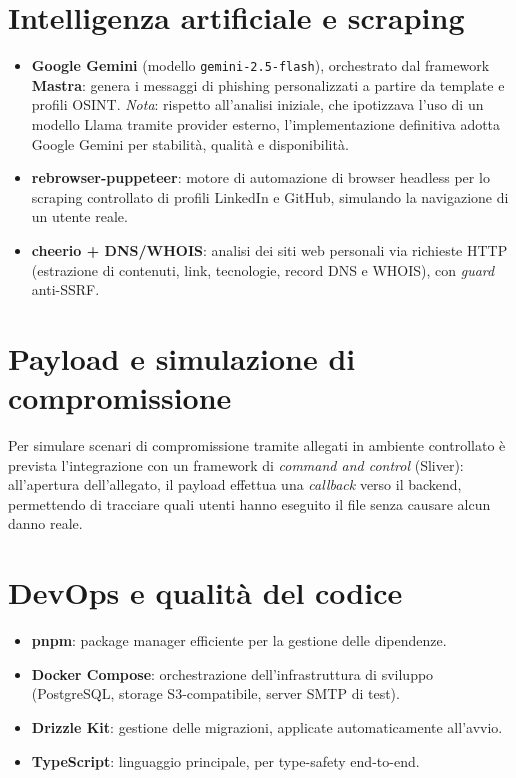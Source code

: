 \documentclass[12pt,a4paper,oneside]{report}
\newcommand{\code}[1]{\texttt{\small #1}}
\begin{document}
\section{Intelligenza artificiale e scraping}
\begin{itemize}[nosep]
  \item \textbf{Google Gemini} (modello \code{gemini-2.5-flash}), orchestrato dal framework
        \textbf{Mastra}: genera i messaggi di phishing personalizzati a partire da template
        e profili OSINT. \emph{Nota}: rispetto all'analisi iniziale, che ipotizzava l'uso di
        un modello Llama tramite provider esterno, l'implementazione definitiva adotta
        Google Gemini per stabilit\`a, qualit\`a e disponibilit\`a.
  \item \textbf{rebrowser-puppeteer}: motore di automazione di browser headless per lo
        scraping controllato di profili LinkedIn e GitHub, simulando la navigazione di un
        utente reale.
  \item \textbf{cheerio + DNS/WHOIS}: analisi dei siti web personali via richieste HTTP
        (estrazione di contenuti, link, tecnologie, record DNS e WHOIS), con \emph{guard}
        anti-SSRF.
\end{itemize}

\section{Payload e simulazione di compromissione}
Per simulare scenari di compromissione tramite allegati in ambiente controllato \`e prevista
l'integrazione con un framework di \emph{command and control} (Sliver): all'apertura
dell'allegato, il payload effettua una \emph{callback} verso il backend, permettendo di
tracciare quali utenti hanno eseguito il file senza causare alcun danno reale.

\section{DevOps e qualit\`a del codice}
\begin{itemize}[nosep]
  \item \textbf{pnpm}: package manager efficiente per la gestione delle dipendenze.
  \item \textbf{Docker Compose}: orchestrazione dell'infrastruttura di sviluppo
        (PostgreSQL, storage S3-compatibile, server SMTP di test).
  \item \textbf{Drizzle Kit}: gestione delle migrazioni, applicate automaticamente all'avvio.
  \item \textbf{TypeScript}: linguaggio principale, per type-safety end-to-end.
\end{itemize}
\end{document}

